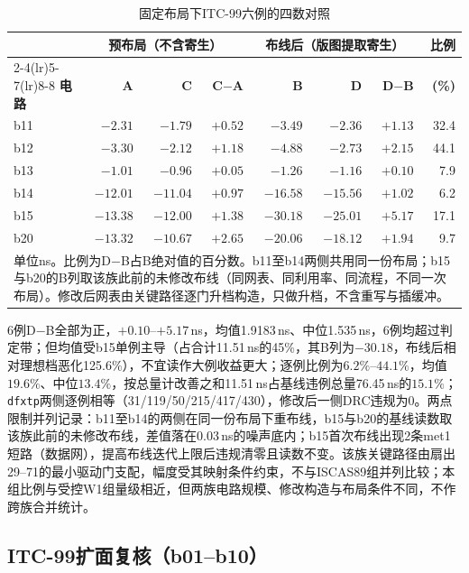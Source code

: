 \documentclass[twocolumn,10pt,fontset=windows]{ctexart}
\begin{document}
\begin{table}[htbp]
\centering\caption{固定布局下ITC-99六例的四数对照}\label{tab:itc_four}
\footnotesize\setlength{\tabcolsep}{3pt}
\begin{tabular}{lrrrrrrr}
\toprule
 & \multicolumn{3}{c}{\textbf{预布局（不含寄生）}} & \multicolumn{3}{c}{\textbf{布线后（版图提取寄生）}} & \textbf{比例}\\
\cmidrule(lr){2-4}\cmidrule(lr){5-7}\cmidrule(lr){8-8}
\textbf{电路} & \textbf{A} & \textbf{C} & \textbf{C$-$A} & \textbf{B} & \textbf{D} & \textbf{D$-$B} & \textbf{(\%)}\\
\midrule
b11 & $-2.31$ & $-1.79$ & $+0.52$ & $-3.49$ & $-2.36$ & $+1.13$ & 32.4\\
b12 & $-3.30$ & $-2.12$ & $+1.18$ & $-4.88$ & $-2.73$ & $+2.15$ & 44.1\\
b13 & $-1.01$ & $-0.96$ & $+0.05$ & $-1.26$ & $-1.16$ & $+0.10$ & 7.9\\
b14 & $-12.01$ & $-11.04$ & $+0.97$ & $-16.58$ & $-15.56$ & $+1.02$ & 6.2\\
b15 & $-13.38$ & $-12.00$ & $+1.38$ & $-30.18$ & $-25.01$ & $+5.17$ & 17.1\\
b20 & $-13.32$ & $-10.67$ & $+2.65$ & $-20.06$ & $-18.12$ & $+1.94$ & 9.7\\
\bottomrule
\multicolumn{8}{p{0.95\columnwidth}}{\footnotesize 单位ns。比例为D$-$B占B绝对值的百分数。b11至b14两侧共用同一份布局；b15与b20的B列取该族此前的未修改布线（同网表、同利用率、同流程，不同一次布局）。修改后网表由关键路径逐门升档构造，只做升档，不含重写与插缓冲。}\\
\end{tabular}
\end{table}

6例D$-$B全部为正，$+0.10$--$+5.17$\,ns，均值1.9183\,ns、中位1.535\,ns，6例均超过判定带；但均值受b15单例主导（占合计11.51\,ns的45\%，其B列为$-30.18$，布线后相对理想档恶化125.6\%），不宜读作大例收益更大；逐例比例为$6.2\%$--$44.1\%$，均值$19.6\%$、中位$13.4\%$，按总量计改善之和11.51\,ns占基线违例总量76.45\,ns的$15.1\%$；\texttt{dfxtp}两侧逐例相等（31/119/50/215/417/430），修改后一侧DRC违规为0。两点限制并列记录：b11至b14的两侧在同一份布局下重布线，b15与b20的基线读数取该族此前的未修改布线，差值落在0.03\,ns的噪声底内；b15首次布线出现2条met1短路（数据网），提高布线迭代上限后违规清零且读数不变。该族关键路径由扇出29--71的最小驱动门支配，幅度受其映射条件约束，不与ISCAS89组并列比较；本组比例与受控W1组量级相近，但两族电路规模、修改构造与布局条件不同，不作跨族合并统计。

\subsection{ITC-99扩面复核（b01--b10）}\label{sec:itc_ext}
\end{document}
